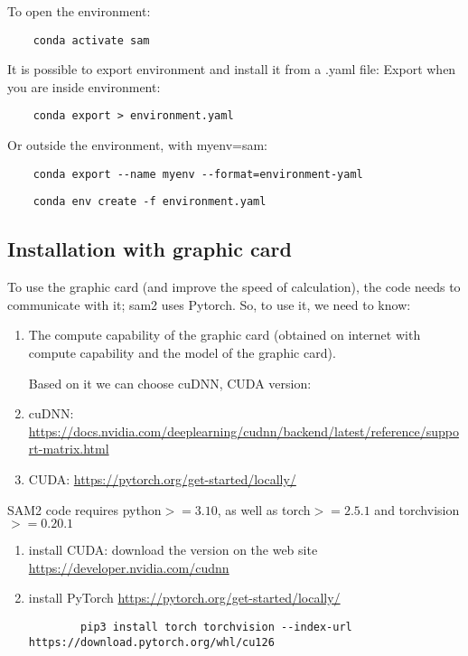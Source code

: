 \documentclass{article}
\begin{document}
To open the environment: 

\begin{lstlisting}
    conda activate sam
\end{lstlisting}



It is possible to export environment and install it from a .yaml file: 
Export when you are inside environment: 
\begin{lstlisting}
    conda export > environment.yaml
\end{lstlisting}
Or outside the environment, with myenv=sam: 

\begin{lstlisting}
    conda export --name myenv --format=environment-yaml
\end{lstlisting}



\begin{lstlisting}
    conda env create -f environment.yaml
\end{lstlisting}


\subsection{Installation with graphic card}

To use the graphic card (and improve the speed of calculation), the code needs to communicate with it; sam2 uses Pytorch. So, to use it, we need to know: 


\begin{enumerate}
    \item The compute capability of the graphic card (obtained on internet with compute capability and the model of the graphic card). \newline
    
    Based on it we can choose cuDNN, CUDA version: 
    
    \item cuDNN: \url{https://docs.nvidia.com/deeplearning/cudnn/backend/latest/reference/support-matrix.html}
    
    
    \item CUDA: \url{https://pytorch.org/get-started/locally/}
    
\end{enumerate}

SAM2 code requires python$>=3.10$, as well as torch$>=2.5.1$ and torchvision$>=0.20.1$



\begin{enumerate}
    \item install CUDA: download the version on the web site \url{https://developer.nvidia.com/cudnn}

    \item install PyTorch \url{https://pytorch.org/get-started/locally/}
    \begin{lstlisting}
        pip3 install torch torchvision --index-url https://download.pytorch.org/whl/cu126
    \end{lstlisting}

\end{enumerate}
\end{document}

